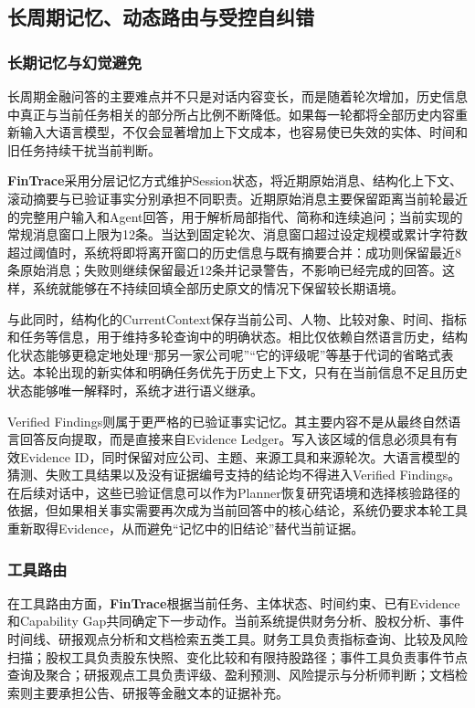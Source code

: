 \subsection{长周期记忆、动态路由与受控自纠错}

\subsubsection{长期记忆与幻觉避免}

长周期金融问答的主要难点并不只是对话内容变长，而是随着轮次增加，历史信息中真正与当前任务相关的部分所占比例不断降低。如果每一轮都将全部历史内容重新输入大语言模型，不仅会显著增加上下文成本，也容易使已失效的实体、时间和旧任务持续干扰当前判断。

\textbf{FinTrace}采用分层记忆方式维护Session状态，将近期原始消息、结构化上下文、滚动摘要与已验证事实分别承担不同职责。近期原始消息主要保留距离当前轮最近的完整用户输入和Agent回答，用于解析局部指代、简称和连续追问；当前实现的常规消息窗口上限为12条。当达到固定轮次、消息窗口超过设定规模或累计字符数超过阈值时，系统将即将离开窗口的历史信息与既有摘要合并：成功则保留最近8条原始消息；失败则继续保留最近12条并记录警告，不影响已经完成的回答。这样，系统就能够在不持续回填全部历史原文的情况下保留较长期语境。

与此同时，结构化的CurrentContext保存当前公司、人物、比较对象、时间、指标和任务等信息，用于维持多轮查询中的明确状态。相比仅依赖自然语言历史，结构化状态能够更稳定地处理“那另一家公司呢”“它的评级呢”等基于代词的省略式表达。本轮出现的新实体和明确任务优先于历史上下文，只有在当前信息不足且历史状态能够唯一解释时，系统才进行语义继承。

Verified Findings则属于更严格的已验证事实记忆。其主要内容不是从最终自然语言回答反向提取，而是直接来自Evidence Ledger。写入该区域的信息必须具有有效Evidence ID，同时保留对应公司、主题、来源工具和来源轮次。大语言模型的猜测、失败工具结果以及没有证据编号支持的结论均不得进入Verified Findings。在后续对话中，这些已验证信息可以作为Planner恢复研究语境和选择核验路径的依据，但如果相关事实需要再次成为当前回答中的核心结论，系统仍要求本轮工具重新取得Evidence，从而避免“记忆中的旧结论”替代当前证据。

\subsubsection{工具路由}

在工具路由方面，\textbf{FinTrace}根据当前任务、主体状态、时间约束、已有Evidence和Capability Gap共同确定下一步动作。当前系统提供财务分析、股权分析、事件时间线、研报观点分析和文档检索五类工具。财务工具负责指标查询、比较及风险扫描；股权工具负责股东快照、变化比较和有限持股路径；事件工具负责事件节点查询及聚合；研报观点工具负责评级、盈利预测、风险提示与分析师判断；文档检索则主要承担公告、研报等金融文本的证据补充。

